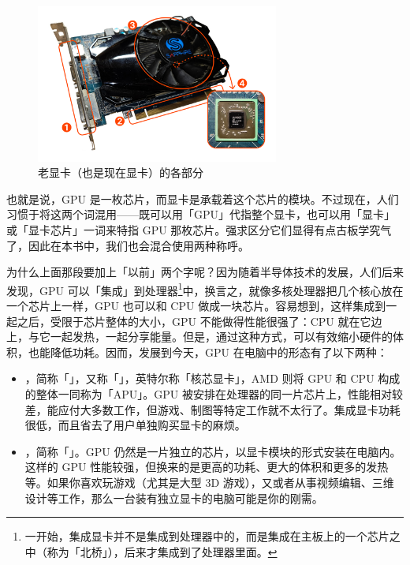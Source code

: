 \begin{figure}[htb!]
  \centering
  \includegraphics[width=8cm]{assets/basic/GPU_parts.png}
  \caption{老显卡（也是现在显卡）的各部分}
  \label{fig:GPU_parts}
\end{figure}

\begin{note}
  也就是说，GPU 是一枚芯片，而显卡是承载着这个芯片的模块。不过现在，人们习惯于将这两个词混用——既可以用「GPU」代指整个显卡，也可以用「显卡」或「显卡芯片」一词来特指 GPU 那枚芯片。强求区分它们显得有点古板学究气了，因此在本书中，我们也会混合使用两种称呼。
\end{note}

为什么上面那段要加上「以前」两个字呢？因为随着半导体技术的发展，人们后来发现，GPU 可以「集成」到处理器\footnote{一开始，集成显卡并不是集成到处理器中的，而是集成在主板上的一个芯片之中（称为「北桥」），后来才集成到了处理器里面。}中，换言之，就像多核处理器把几个核心放在一个芯片上一样，GPU 也可以和 CPU 做成一块芯片。容易想到，这样集成到一起之后，受限于芯片整体的大小，GPU 不能做得性能很强了：CPU 就在它边上，与它一起发热，一起分享能量。但是，通过这种方式，可以有效缩小硬件的体积，也能降低功耗。因而，发展到今天，GPU 在电脑中的形态有了以下两种：

\begin{itemize}
  \item {}，简称「」，又称「」，英特尔称「核芯显卡」，AMD 则将 GPU 和 CPU 构成的整体一同称为「APU」。GPU 被安排在处理器的同一片芯片上，性能相对较差，能应付大多数工作，但游戏、制图等特定工作就不太行了。集成显卡功耗很低，而且省去了用户单独购买显卡的麻烦。
  \item {}，简称「」。GPU 仍然是一片独立的芯片，以显卡模块的形式安装在电脑内。这样的 GPU 性能较强，但换来的是更高的功耗、更大的体积和更多的发热等。如果你喜欢玩游戏（尤其是大型 3D 游戏），又或者从事视频编辑、三维设计等工作，那么一台装有独立显卡的电脑可能是你的刚需。
\end{itemize}


